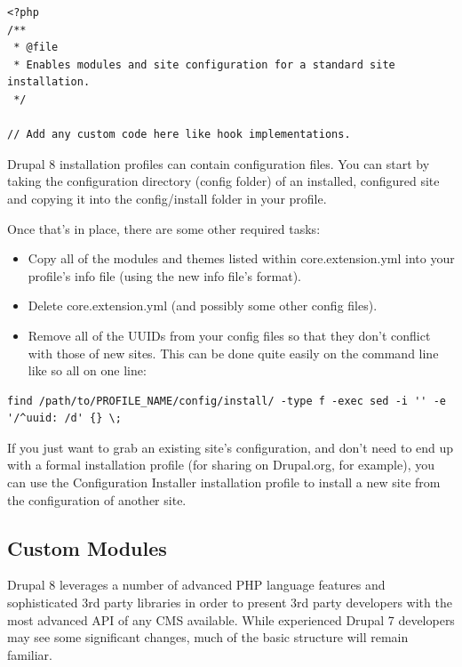 \begin{lstlisting}[caption={.profile.yml file},label={profile-file}]
<?php
/**
 * @file
 * Enables modules and site configuration for a standard site installation.
 */

// Add any custom code here like hook implementations.
\end{lstlisting}

Drupal 8 installation profiles can contain configuration files. You can start by taking the configuration directory (config folder) of an installed, configured site and copying it into the config/install folder in your profile.

Once that's in place, there are some other required tasks:

\begin{itemize}
	\item Copy all of the modules and themes listed within core.extension.yml into your profile's info file (using the new info file's format).
	\item Delete core.extension.yml (and possibly some other config files).
	\item Remove all of the UUIDs from your config files so that they don't conflict with those of new sites. This can be done quite easily on the command line like so all on one line:
\end{itemize}

\begin{lstlisting}[caption={.info.yml file},label={profile-file}]
find /path/to/PROFILE_NAME/config/install/ -type f -exec sed -i '' -e '/^uuid: /d' {} \;
\end{lstlisting}

If you just want to grab an existing site's configuration, and don't need to end up with a formal installation profile (for sharing on Drupal.org, for example), you can use the Configuration Installer installation profile to install a new site from the configuration of another site.

\subsection{Custom Modules}

Drupal 8 leverages a number of advanced PHP language features and sophisticated 3rd party libraries in order to present 3rd party developers with the most advanced API of any CMS available. While experienced Drupal 7 developers may see some significant changes, much of the basic structure will remain familiar.

